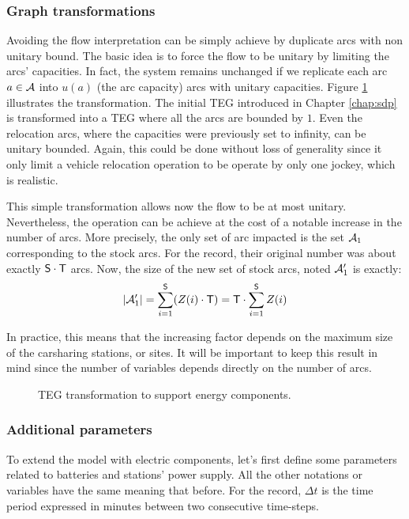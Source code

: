 \begin{bibunit}[ieeetr]
\subsubsection{Graph transformations} \label{sec:graphTransformations}
Avoiding the flow interpretation can be simply achieve by duplicate arcs with non unitary bound.
The basic idea is to force the flow to be unitary by limiting the arcs' capacities.
In fact, the system remains unchanged if we replicate each arc $a \in \mathcal{A}$ into $u(a)$ (the arc capacity) arcs with unitary capacities.
Figure \ref{fig:tegTransformation} illustrates the transformation.
The initial TEG introduced in Chapter \ref{chap:sdp} is transformed into a TEG where all the arcs are bounded by $1$.
Even the relocation arcs, where the capacities were previously set to infinity, can be unitary bounded.
Again, this could be done without loss of generality since it only limit a vehicle relocation operation to be operate by only one jockey, which is realistic.

\medskip
This simple transformation allows now the flow to be at most unitary.
Nevertheless, the operation can be achieve at the cost of a notable increase in the number of arcs.
More precisely, the only set of arc impacted is the set $\mathcal{A}_1$ corresponding to the stock arcs.
For the record, their original number was about exactly $\mathsf{S} \cdot \mathsf{T}$ arcs.
Now, the size of the new set of stock arcs, noted $\mathcal{A}_1'$ is exactly:
\begin{equation}
|\mathcal{A}_1'| = \sum\limits_{i=1}^{\mathsf{S}} (Z(i) \cdot \mathsf{T}) = \mathsf{T} \cdot \sum\limits_{i=1}^{\mathsf{S}} Z(i)
\end{equation}

In practice, this means that the increasing factor depends on the maximum size of the carsharing stations, or sites.
It will be important to keep this result in mind since the number of variables depends directly on the number of arcs.

\begin{figure}[t]
\begin{center}
\scalebox{0.7}{}
\end{center}
\caption{TEG transformation to support energy components.}
\label{fig:tegTransformation}
\end{figure}

\subsubsection{Additional parameters}
To extend the model with electric components, let's first define some parameters related to batteries and stations' power supply.
All the other notations or variables have the same meaning that before.
For the record, $\Delta t$ is the time period expressed in minutes between two consecutive time-steps.


\end{bibunit}
